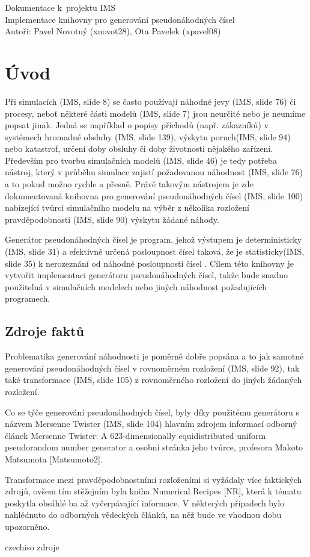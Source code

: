\documentclass[a4paper,11pt]{article}
\begin{document}
\begin{center}
  \Huge
  Dokumentace k~projektu IMS\\
  \Large
  Implementace knihovny pro generování pseudonáhodných čísel\\
  \large
  Autoři: Pavel Novotný (xnovot28), Ota Pavelek (xpavel08)

\end{center}
\section{Úvod}
Při simulacích (IMS, slide 8) se často používají náhodné jevy (IMS, slide 76) či procesy, neboť některé části modelů (IMS, slide 7) jsou neurčité nebo je neumíme popsat jinak. Jedná se například o popisy příchodů (např. zákazníků) v systémech hromadné obsluhy (IMS, slide 139), výskytu poruch(IMS, slide 94) nebo katastrof, určení doby obsluhy či doby životnosti nějakého zařízení. Především pro tvorbu simulačních modelů (IMS, slide 46) je tedy potřeba nástroj, který v průběhu simulace zajistí požadovanou náhodnost (IMS, slide 76) a to pokud možno rychle a přesně. Právě takovým nástrojem je zde dokumentovaná knihovna pro generování pseudonáhodných čísel (IMS, slide 100) nabízející tvůrci simulačního modelu na výběr z několika rozložení pravděpodobnosti (IMS, slide 90) výskytu žádané náhody.

Generátor pseudonáhodných čísel je program, jehož výstupem je deterministicky (IMS, slide 31) a efektivně určená posloupnost čísel taková, že je statisticky(IMS, slide 35) k nerozeznání od náhodné posloupnosti čísel \cite{wiki}. Cílem této knihovny je vytvořit implementaci generátoru pseudonáhodných čísel, takže bude snadno použitelná v simulačních modelech nebo jiných náhodnost požadujících programech.
\subsection{Zdroje faktů}
Problematika generování náhodnosti je poměrně dobře popsána a to jak samotné generování pseudonáhodných čísel v rovnoměrném rozložení (IMS, slide 92), tak také transformace (IMS, slide 105) z rovnoměrného rozložení do jiných žádaných rozložení.

Co se týče generování pseudonáhodných čísel, byly díky použitému generátoru s názvem Mersenne Twister (IMS, slide 104) hlavním zdrojem informací odborný článek Mersenne Twister: A 623-dimensionally equidistributed uniform pseudorandom number generator \cite{Matsumoto} a osobní stránka jeho tvůrce, profesora Makoto Matsumota [Matsumoto2].

Transformace mezi pravděpodobnostními rozloženími si vyžádaly více faktických zdrojů, ovšem tím stěžejním byla kniha Numerical Recipes [NR], která k tématu poskytla obsáhlé ba až vyčerpávající informace. V některých případech bylo nahlédnuto do odborných vědeckých článků, na něž bude ve vhodnou dobu upozorněno.

\renewcommand{\refname}{Bibliografie}
 {czechiso}
 {zdroje}
\end{document}
